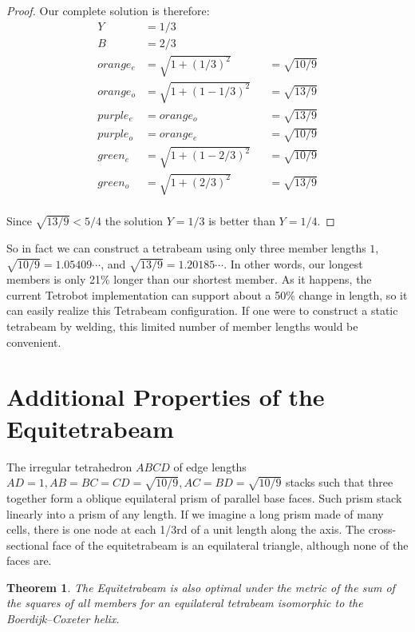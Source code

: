 \documentclass[11pt]{article}
\newtheorem{theorem}{Theorem}
\begin{document}
\begin{proof}
Our complete solution is therefore:
\begin{align*}
  Y &= 1/3 \\
  B &= 2/3 \\  
   orange_e &= \sqrt{1 + (1/3)^2} & &= \sqrt{10/9} \\
 orange_o &= \sqrt{1 + (1-1/3)^2} & &= \sqrt{13/9} \\
 purple_e &=  orange_o & &= \sqrt{13/9} \\
 purple_o &=  orange_e & &= \sqrt{10/9} \\
 green_e &=  \sqrt{ 1 + (1 - 2/3)^2} & &= \sqrt{10/9} \\ 
 green_o &=  \sqrt{1 + (2/3)^2} & &= \sqrt{13/9} \\
\end{align*}

Since $\sqrt{13/9} < 5/4$ the solution $Y = 1/3$ is better than $Y = 1/4$.

 \end{proof}

So in fact we can construct a tetrabeam using only three member lengths $1$,
$\sqrt{10/9} = 1.05409\cdots$, and $\sqrt{13/9} = 1.20185\cdots$.
In other words, our longest members is only 21\% longer than our shortest member.
As it happens, the current Tetrobot implementation can support about a 50\%
change in length, so it can easily realize this Tetrabeam configuration. If one were
to construct a static tetrabeam by welding, this limited number of member lengths would be convenient.

\section{Additional Properties of the Equitetrabeam}

The irregular tetrahedron $ABCD$ of edge lengths $AD = 1, AB = BC = CD = \sqrt{10/9}, AC = BD = \sqrt{10/9}$ stacks
such that three together form a oblique equilateral prism of parallel base faces. Such prism stack linearly into
a prism of any length. If we imagine a long prism made of many cells, there is one node at each 1/3rd of a unit length
along the axis. The cross-sectional face of the equitetrabeam is an equilateral triangle, although none of the faces
are.

\begin{theorem}
  The Equitetrabeam is also optimal under the metric of the sum of the squares of all members
  for an equilateral tetrabeam isomorphic to the Boerdijk--Coxeter helix.
  \end{theorem}
\end{document}
